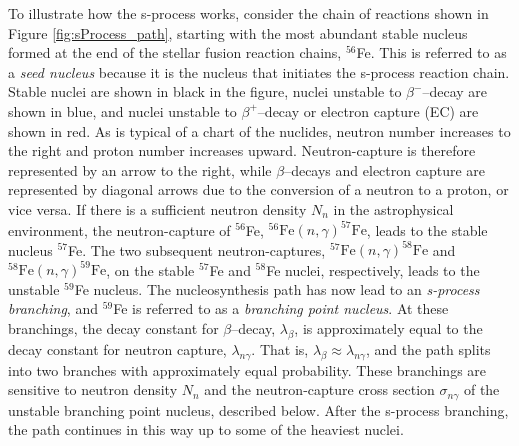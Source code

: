 To illustrate how the s-process works, consider the chain of reactions shown in Figure \ref{fig:sProcess_path}, starting with the most abundant stable nucleus formed at the end of the stellar fusion reaction chains, $^{56}$Fe. This is referred to as a \emph{seed nucleus} because it is the nucleus that initiates the s-process reaction chain. Stable nuclei are shown in black in the figure, nuclei unstable to $\beta^{-}$--decay are shown in blue, and nuclei unstable to $\beta^{+}$--decay or electron capture (EC) are shown in red. As is typical of a chart of the nuclides, neutron number increases to the right and proton number increases upward. Neutron-capture is therefore represented by an arrow to the right, while $\beta$--decays and electron capture are represented by diagonal arrows due to the conversion of a neutron to a proton, or vice versa. If there is a sufficient neutron density $N_{n}$ in the astrophysical environment, the neutron-capture of $^{56}$Fe, $^{56}\mathrm{Fe}(n,\gamma)^{57}\mathrm{Fe}$, leads to the stable nucleus $^{57}$Fe. The two subsequent neutron-captures,  $^{57}\mathrm{Fe}(n,\gamma)^{58}\mathrm{Fe}$ and  $^{58}\mathrm{Fe}(n,\gamma)^{59}\mathrm{Fe}$, on the stable $^{57}$Fe and $^{58}$Fe nuclei, respectively, leads to the unstable $^{59}$Fe nucleus. The nucleosynthesis path has now lead to an \emph{s-process branching}, and $^{59}$Fe is referred to as a \emph{branching point nucleus}. At these branchings, the decay constant for $\beta$--decay, $\lambda_{\beta}$, is approximately equal to the decay constant for neutron capture, $\lambda_{n\gamma}$. That is, $\lambda_{\beta} \approx \lambda_{n\gamma}$, and the path splits into two branches with approximately equal probability. These branchings are sensitive to neutron density $N_{n}$ and the neutron-capture cross section $\sigma_{n\gamma}$ of the unstable branching point nucleus, described below. After the s-process branching, the path continues in this way up to some of the heaviest nuclei.



